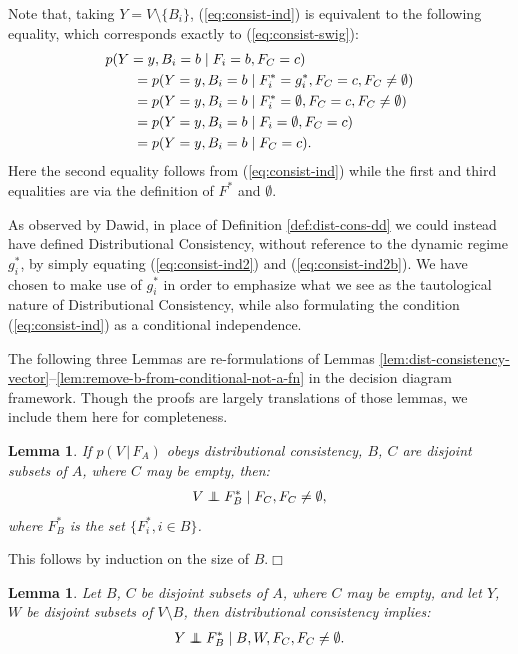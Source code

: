 \documentclass[11pt]{article}
\newtheorem{lemma}[theorem]{Lemma}
\newcommand\indep{\protect\mathpalette{\protect\independenT}{\perp}}
\def\independenT#1#2{\mathrel{\rlap{$#1#2$}\mkern2.5mu{#1#2}}}
\begin{document}
{\noindent Note that, taking $Y=V\setminus \{B_i\}$,  (\ref{eq:consist-ind}) is equivalent to the following equality, which corresponds exactly to (\ref{eq:consist-swig}):
\begin{align}\label{eq:consist-ind2}
\MoveEqLeft{p(Y=y, B_i = b \mid F_{i} = b, F_{C}=c)}\\
&= p(Y=y, B_i = b \mid F^*_{i} = g^*_i, F_{C}=c, F_{C}\neq \emptyset)\nonumber \\
&=  p(Y=y, B_i = b \mid  F^*_{i} = \emptyset, F_{C}=c, F_{C}\neq \emptyset)\nonumber\\
&=  p(Y=y, B_i = b \mid  F_{i} = \emptyset, F_{C}=c)\nonumber\\
&=  p(Y=y, B_i=b \mid F_{C}=c).\label{eq:consist-ind2b}
\end{align}
Here the second equality follows from (\ref{eq:consist-ind}) while the first and third equalities are via the definition of $F^*$ and $\emptyset$.

As observed by Dawid, in place of Definition \ref{def:dist-cons-dd} we could instead have defined Distributional Consistency, without reference to the dynamic regime $g_i^*$, by simply equating (\ref{eq:consist-ind2}) and (\ref{eq:consist-ind2b}). We have chosen to make use of $g_i^*$ in order to emphasize what we see as the tautological nature of Distributional Consistency, while also formulating the condition (\ref{eq:consist-ind}) as a conditional independence.

The following three Lemmas are re-formulations of Lemmas \ref{lem:dist-consistency-vector}--\ref{lem:remove-b-from-conditional-not-a-fn} in the decision diagram framework. Though the proofs are largely translations of those lemmas, we include them here for completeness.


\begin{lemma}\label{lem:dist-consistency-vector-phil}
If $p(V\,|\, F_A)$ obeys distributional consistency,   $B$, $C$ are disjoint subsets of $A$, where $C$ may be empty,
then: 
\begin{align}\label{eq:consist-vector-phil}
V \indep F^*_B \mid F_C, F_{C}\neq \emptyset,
\end{align}
where $F^*_B$ is the set $\{F^*_i, i \in B\}$.
\end{lemma}

 This follows by induction on the size of $B$.\hfill$\Box$


\begin{lemma}\label{lem:cond-consistency-phil} Let $B$, $C$ be disjoint subsets of $A$, where $C$ may be empty, and let $Y$, $W$ be disjoint subsets of $V\setminus B$, then distributional consistency implies:
\begin{align}\label{eq:consist-cond-swig-phil}
Y \indep F^*_B \mid B, W, F_C, F_C\neq \emptyset.
\end{align}
\end{lemma}

}
\end{document}
